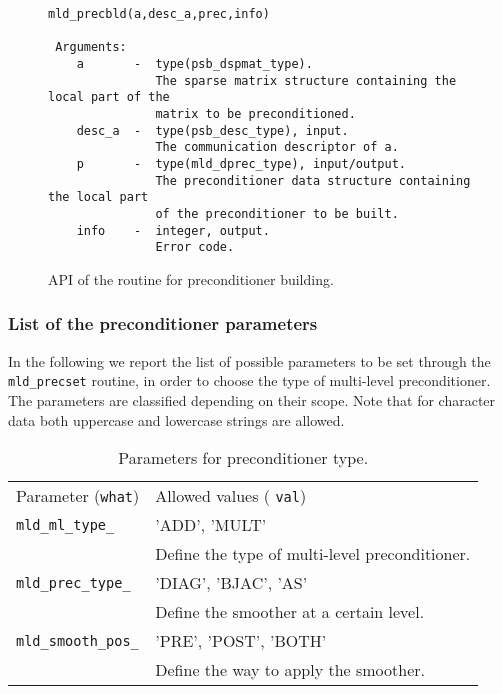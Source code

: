 %
\begin{figure}[h]
\begin{center}
{\small
\begin{verbatim} 
mld_precbld(a,desc_a,prec,info)

 Arguments:
    a       -  type(psb_dspmat_type).
               The sparse matrix structure containing the local part of the
               matrix to be preconditioned.
    desc_a  -  type(psb_desc_type), input.
               The communication descriptor of a.
    p       -  type(mld_dprec_type), input/output.
               The preconditioner data structure containing the local part
               of the preconditioner to be built.
    info    -  integer, output.
               Error code.              
\end{verbatim}
}
\end{center}
\caption{API of the routine for preconditioner building.\label{fig:prcbld}}
\end{figure}

\subsubsection{List of the preconditioner parameters\label{sec:list}}

In the following we report the list of possible parameters to be set through the \verb|mld_precset| routine,
in order to choose the type of multi-level preconditioner. The parameters are classified depending on their scope.
Note that for character data both uppercase and lowercase strings are allowed.
\begin{table}[h]
{\small \label{tab:prec_type}
\begin{tabular}{ll}
Parameter (\verb|what|)   & Allowed values ( \verb|val|)\\
\verb|mld_ml_type_|       & 'ADD', 'MULT'\\
                          & Define the type of multi-level preconditioner.\\
\verb|mld_prec_type_|     & 'DIAG', 'BJAC', 'AS' \\
                          & Define the smoother at a certain level.\\
\verb|mld_smooth_pos_|    & 'PRE', 'POST', 'BOTH'\\
                          & Define the way to apply the smoother.\\ 
\end{tabular}
\caption{Parameters for preconditioner type.}
}
\end{table}

